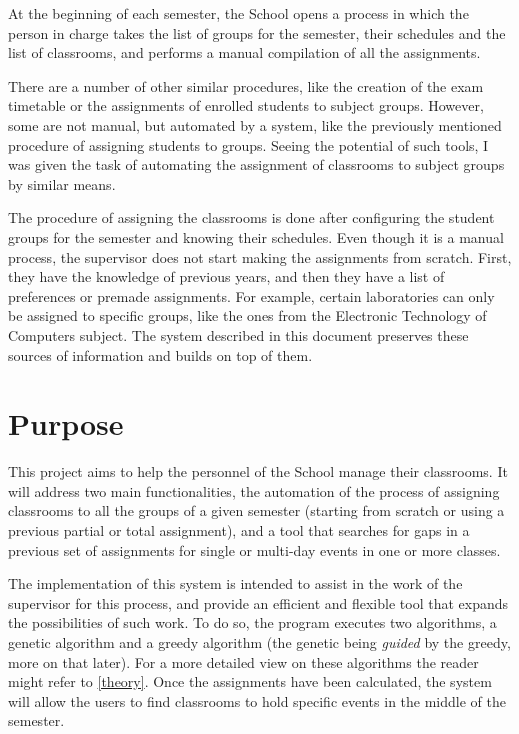 At the beginning of each semester, the School opens a process in which the person in charge takes the list of groups for the semester, their schedules and the list of classrooms, and performs a manual compilation of all the assignments.

There are a number of other similar procedures, like the creation of the exam timetable or the assignments of enrolled students to subject groups. However, some are not manual, but automated by a system, like the previously mentioned procedure of assigning students to groups. Seeing the potential of such tools, I was given the task of automating the assignment of classrooms to subject groups by similar means. 

The procedure of assigning the classrooms is done after configuring the student groups for the semester and knowing their schedules. Even though it is a manual process, the supervisor does not start making the assignments from scratch. First, they have the knowledge of previous years, and then they have a list of preferences or premade assignments. For example, certain laboratories can only be assigned to specific groups, like the ones from the Electronic Technology of Computers subject. The system described in this document preserves these sources of information and builds on top of them.


\section{Purpose}\label{purpose}

This project aims to help the personnel of the School manage their classrooms. It will address two main functionalities, the automation of the process of assigning classrooms to all the groups of a given semester (starting from scratch or using a previous partial or total assignment), and a tool that searches for gaps in a previous set of assignments for single or multi-day events in one or more classes.

The implementation of this system is intended to assist in the work of the supervisor for this process, and provide an efficient and flexible tool that expands the possibilities of such work. To do so, the program executes two algorithms, a genetic algorithm and a greedy algorithm (the genetic being \textit{guided} by the greedy, more on that later). For a more detailed view on these algorithms the reader might refer to \ref{theory}. Once the assignments have been calculated, the system will allow the users to find classrooms to hold specific events in the middle of the semester.

